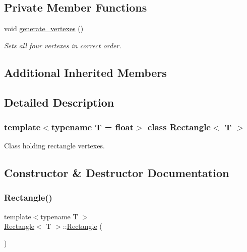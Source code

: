 \subsection*{Private Member Functions}
\begin{DoxyCompactItemize}
\item 
void \mbox{\hyperlink{classRectangle_a0f9d67fb9478883f067c47cdc7bf7bca}{generate\+\_\+vertexes}} ()
\begin{DoxyCompactList}\small\item\em Sets all four vertexes in correct order. \end{DoxyCompactList}\end{DoxyCompactItemize}
\subsection*{Additional Inherited Members}


\subsection{Detailed Description}
\subsubsection*{template$<$typename T = float$>$\newline
class Rectangle$<$ T $>$}

Class holding rectangle vertexes. 

\subsection{Constructor \& Destructor Documentation}
\mbox{\label{classRectangle_a9d9da3fc8bcb125516cbf2d711d325eb}} 
\subsubsection{\texorpdfstring{Rectangle()}{Rectangle()}\hspace{0.1cm}{\footnotesize\ttfamily [1/3]}}
{\footnotesize\ttfamily template$<$typename T $>$ \\
\mbox{\hyperlink{classRectangle}{Rectangle}}$<$ T $>$\+::\mbox{\hyperlink{classRectangle}{Rectangle}} (\begin{DoxyParamCaption}{ }\end{DoxyParamCaption})}



